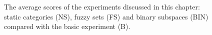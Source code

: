 \begin{figure}
\caption{The average scores of the experiments discussed in this chapter: static categories (NS), fuzzy sets (FS) and binary subspaces (BIN) compared with the basic experiment (B).}
\label{f:par:cat}
\end{figure}

